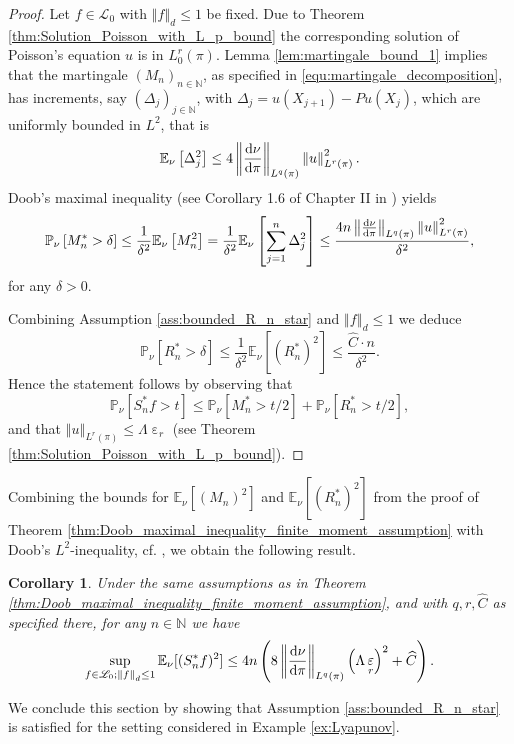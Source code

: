 \documentclass[12pt]{article}
\theoremstyle{plain}
\newtheorem{cor}[thm]{Corollary}
\renewcommand{\d}{{\rm d}}
\newcommand{\norm}[1]{\left\Vert #1 \right\Vert}
\newcommand{\N}{\mathbb{N}}
\newcommand{\E}{\mathbb{E}}
\DeclareMathOperator{\eps}{\varepsilon}
\begin{document}
{\begin{proof}
Let $f \in \mathscr{L}_0$ with $\norm{f}_d\leq 1$ be fixed. 
Due to Theorem \ref{thm:Solution_Poisson_with_L_p_bound} the corresponding solution of Poisson's equation $u$ is in $L^r_0(\pi)$.   
Lemma \ref{lem:martingale_bound_1} implies that the martingale $(M_n)_{n \in \N}$, as specified in \eqref{equ:martingale_decomposition}, has increments, say $(\Delta_j)_{j \in \N}$, with $\Delta_j = u(X_{j+1}) -Pu(X_j) $, which are uniformly bounded in $L^2$, that is 
\[
\E_\nu\left[\Delta_j^2\right] \leq  4\norm{\frac{\d \nu}{\d \pi}}_{L^q(\pi)} \norm{u}_{L^{r}(\pi)}^2.
\]
Doob's maximal inequality (see Corollary 1.6 of Chapter II in \cite{revuz1999continuous}) yields 
\[
\mathbb{P}_\nu\left[ M_n^* > \delta \right] \leq \frac{1}{\delta^2} \E_\nu\left[ M_n^2 \right] = \frac{1}{\delta^2}\E_\nu\left[ \sum_{j=1}^n \Delta_j^2 \right] \leq \frac{4n\norm{\frac{\d \nu}{\d \pi}}_{L^q(\pi)} \norm{u}_{L^{r}(\pi)}^2}{\delta^2},
\]
for any $\delta>0$.

Combining Assumption \ref{ass:bounded_R_n_star} and $\norm{f}_d\leq 1$ we deduce 
\[
\mathbb{P}_\nu\left[ R_n^* > \delta \right] \leq \frac{1}{\delta^2} \E_\nu\left[ (R_n^*)^2 \right] \leq \frac{\widehat{C} \cdot n}{\delta^2}. 
\]
Hence the statement follows by observing that 
\[
\mathbb{P}_\nu\left[ S_n^*f > t \right] \leq \mathbb{P}_\nu\left[ M_n^* > t/2 \right] + \mathbb{P}_\nu\left[ R_n^* > t/2 \right],
\]
and that $\norm{u}_{L^r(\pi)} \leq \Lambda \eps_r $ (see Theorem \ref{thm:Solution_Poisson_with_L_p_bound}). 
\end{proof}

Combining the bounds for $\E_\nu\left[(M_n)^2\right]$ and $\E_\nu\left[ (R_n^*)^2 \right]$ from the proof of Theorem \ref{thm:Doob_maximal_inequality_finite_moment_assumption} with Doob's $L^2$-inequality, cf. \cite{revuz1999continuous}, we obtain the following result. 
\begin{cor}\label{cor:L_2_maximal_inequality_finite_moment_assumption}
Under the same assumptions as in Theorem \ref{thm:Doob_maximal_inequality_finite_moment_assumption}, and with $q,r, \widehat{C}$ as specified there, for any $n \in \N$ we have 
\[
\sup_{f \in \mathscr{L}_0; \norm{f}_d \leq 1}
\E_\nu[(S_n^* f)^2] \leq 
{4n}\left(8 \norm{\frac{\d \nu}{\d \pi}}_{L^q(\pi)} \left(\Lambda\eps_r\right)^2 + \widehat{C} \right).
\]
 
\end{cor}

We conclude this section by showing that Assumption \ref{ass:bounded_R_n_star} is satisfied for the setting considered in Example \ref{ex:Lyapunov}.



}
\end{document}

